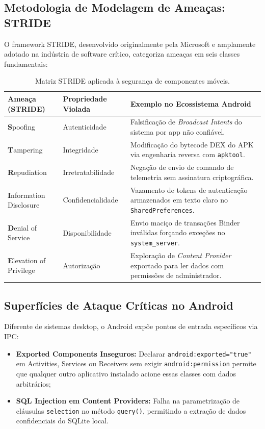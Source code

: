 \subsection{Metodologia de Modelagem de Ameaças: STRIDE}
O framework STRIDE, desenvolvido originalmente pela Microsoft e amplamente adotado na indústria de software crítico, categoriza ameaças em seis classes fundamentais:
\begin{table}[htbp]
\centering
\small
\begin{tabularx}{\textwidth}{lXX}
\toprule
\textbf{Ameaça (STRIDE)} & \textbf{Propriedade Violada} & \textbf{Exemplo no Ecossistema Android} \\
\midrule
\textbf{S}poofing & Autenticidade & Falsificação de \textit{Broadcast Intents} do sistema por app não confiável. \\
\textbf{T}ampering & Integridade & Modificação do bytecode DEX do APK via engenharia reversa com \texttt{apktool}. \\
\textbf{R}epudiation & Irretratabilidade & Negação de envio de comando de telemetria sem assinatura criptográfica. \\
\textbf{I}nformation Disclosure & Confidencialidade & Vazamento de tokens de autenticação armazenados em texto claro no \texttt{SharedPreferences}. \\
\textbf{D}enial of Service & Disponibilidade & Envio maciço de transações Binder inválidas forçando exceções no \texttt{system\_server}. \\
\textbf{E}levation of Privilege & Autorização & Exploração de \textit{Content Provider} exportado para ler dados com permissões de administrador. \\
\bottomrule
\end{tabularx}
\caption{Matriz STRIDE aplicada à segurança de componentes móveis.}
\label{tab:stride}
\end{table}

\subsection{Superfícies de Ataque Críticas no Android}
Diferente de sistemas desktop, o Android expõe pontos de entrada específicos via IPC:
\begin{itemize}
    \item \textbf{Exported Components Inseguros:} Declarar \texttt{android:exported="true"} em Activities, Services ou Receivers sem exigir \texttt{android:permission} permite que qualquer outro aplicativo instalado acione essas classes com dados arbitrários;
    \item \textbf{SQL Injection em Content Providers:} Falha na parametrização de cláusulas \texttt{selection} no método \texttt{query()}, permitindo a extração de dados confidenciais do SQLite local.
\end{itemize}

